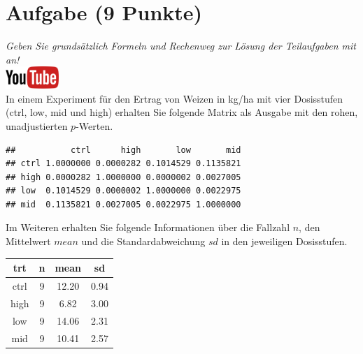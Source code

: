 \documentclass[a4paper, 9pt]{scrartcl}\usepackage[]{graphicx}\usepackage[]{xcolor}
\makeatletter
\newenvironment{kframe}{%
 \def\at@end@of@kframe{}%
 \ifinner\ifhmode%
  \def\at@end@of@kframe{\end{minipage}}%
  \begin{minipage}{\columnwidth}%
 \fi\fi%
 \def\FrameCommand##1{\hskip\@totalleftmargin \hskip-\fboxsep
 \colorbox{shadecolor}{##1}\hskip-\fboxsep
     \hskip-\linewidth \hskip-\@totalleftmargin \hskip\columnwidth}%
 \MakeFramed {\advance\hsize-\width
   \@totalleftmargin\z@ \linewidth\hsize
   \@setminipage}}%
 {\par\unskip\endMakeFramed%
 \at@end@of@kframe}
\newenvironment{knitrout}{}{} %
\makeatother
\begin{document}
\vspace{1Ex}

 
\clearpage

\section{Aufgabe \hfill (9 Punkte)}

\textit{Geben Sie grunds{\"a}tzlich Formeln und Rechenweg zur L{\"o}sung der
  Teilaufgaben mit an!} \\[1Ex]

 \hfill\href{https://youtu.be/RagTFFKFbFg}{\includegraphics[width =
   2cm]{img/youtube}}\\[1Ex]



 
 In einem Experiment f{\"u}r den Ertrag von Weizen in kg/ha mit vier
 Dosisstufen (ctrl, low, mid und high) erhalten Sie folgende Matrix als
 \Rlogo Ausgabe mit den rohen, unadjustierten $p$-Werten.



\begin{knitrout}
\color{fgcolor}\begin{kframe}
\begin{verbatim}
##           ctrl      high       low       mid
## ctrl 1.0000000 0.0000282 0.1014529 0.1135821
## high 0.0000282 1.0000000 0.0000002 0.0027005
## low  0.1014529 0.0000002 1.0000000 0.0022975
## mid  0.1135821 0.0027005 0.0022975 1.0000000
\end{verbatim}
\end{kframe}
\end{knitrout}

Im Weiteren erhalten Sie folgende Informationen {\"u}ber die Fallzahl $n$, den
Mittelwert $mean$ und die Standardabweichung $sd$ in den jeweiligen Dosisstufen.

\begin{knitrout}
\color{fgcolor}\begin{table}[!h]
\centering
\begin{tabular}{cccc}
\toprule
trt & n & mean & sd\\
\midrule
ctrl & 9 & 12.20 & 0.94\\
high & 9 & 6.82 & 3.00\\
low & 9 & 14.06 & 2.31\\
mid & 9 & 10.41 & 2.57\\
\bottomrule
\end{tabular}
\end{table}

\end{knitrout}
\end{document}
